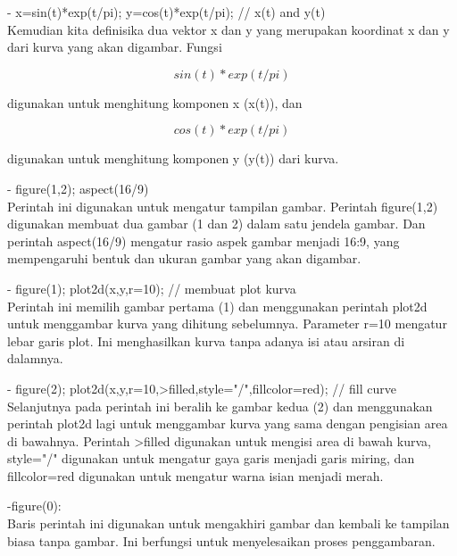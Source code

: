 \documentclass[a4paper,10pt]{article}
\begin{document}
\begin{eulernotebook}
\begin{eulercomment}
\begin{eulercomment}
\begin{eulercomment}
\begin{eulercomment}
\begin{eulercomment}
\begin{eulercomment}
\begin{eulercomment}
\begin{eulercomment}
\begin{eulercomment}
\begin{eulercomment}
\begin{eulercomment}
\begin{eulercomment}
\begin{eulercomment}
- x=sin(t)*exp(t/pi); y=cos(t)*exp(t/pi); // x(t) and y(t)\\
Kemudian kita definisika dua vektor x dan y yang merupakan koordinat x
dan y dari kurva yang akan digambar. Fungsi\\
\end{eulercomment}
\begin{eulerformula}
\[
sin(t)*exp(t/pi)
\]
\end{eulerformula}
\begin{eulercomment}
digunakan untuk menghitung komponen x (x(t)), dan\\
\end{eulercomment}
\begin{eulerformula}
\[
cos(t)*exp(t/pi)
\]
\end{eulerformula}
\begin{eulercomment}
digunakan untuk menghitung komponen y (y(t)) dari kurva.

- figure(1,2); aspect(16/9)\\
Perintah ini digunakan untuk mengatur tampilan gambar. Perintah
figure(1,2) digunakan membuat dua gambar (1 dan 2) dalam satu jendela
gambar. Dan perintah aspect(16/9) mengatur rasio aspek gambar menjadi
16:9, yang mempengaruhi bentuk dan ukuran gambar yang akan digambar.

- figure(1); plot2d(x,y,r=10); // membuat plot kurva\\
Perintah ini memilih gambar pertama (1) dan menggunakan perintah
plot2d untuk menggambar kurva yang dihitung sebelumnya. Parameter r=10
mengatur lebar garis plot. Ini menghasilkan kurva tanpa adanya isi
atau arsiran di dalamnya.

- figure(2); plot2d(x,y,r=10,\textgreater{}filled,style="/",fillcolor=red); // fill
curve\\
Selanjutnya pada perintah ini beralih ke gambar kedua (2) dan
menggunakan perintah plot2d lagi untuk menggambar kurva yang sama
dengan pengisian area di bawahnya. Perintah \textgreater{}filled digunakan untuk
mengisi area di bawah kurva, style="/" digunakan untuk mengatur gaya
garis menjadi garis miring, dan fillcolor=red digunakan untuk mengatur
warna isian menjadi merah.

-figure(0):\\
Baris perintah ini digunakan untuk mengakhiri gambar dan kembali ke
tampilan biasa tanpa gambar. Ini berfungsi untuk menyelesaikan proses
penggambaran.


\end{eulercomment}
\end{eulercomment}
\end{eulercomment}
\end{eulercomment}
\end{eulercomment}
\end{eulercomment}
\end{eulercomment}
\end{eulercomment}
\end{eulercomment}
\end{eulercomment}
\end{eulercomment}
\end{eulercomment}
\end{eulercomment}
\end{eulernotebook}
\end{document}
